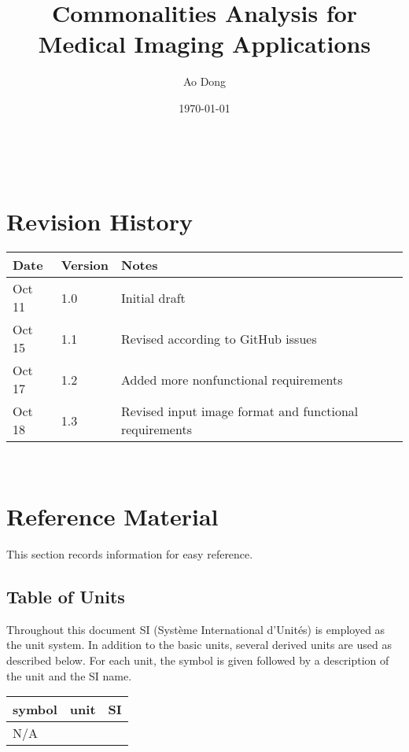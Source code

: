 \documentclass[12pt]{article}
\begin{document}
\title{Commonalities Analysis for Medical Imaging Applications} 
\author{Ao Dong}
\date{\today}

\maketitle

~\newpage


\section{Revision History}

\begin{tabularx}{\textwidth}{p{3cm}p{2cm}X}
\toprule {\bf Date} & {\bf Version} & {\bf Notes}\\
\midrule
Oct 11 & 1.0 & Initial draft\\
Oct 15 & 1.1 & Revised according to GitHub issues\\
Oct 17 & 1.2 & Added more nonfunctional requirements\\
Oct 18 & 1.3 & Revised input image format and functional requirements\\
\bottomrule
\end{tabularx}

~\newpage
	
\section{Reference Material}

This section records information for easy reference.

\subsection{Table of Units}

Throughout this document SI (Syst\`{e}me International d'Unit\'{e}s) is employed
as the unit system.  In addition to the basic units, several derived units are
used as described below.  For each unit, the symbol is given followed by a
description of the unit and the SI name.
~\newline

\renewcommand{\arraystretch}{1.2}
  \noindent \begin{tabular}{l l l} 
    \toprule		
    \textbf{symbol} & \textbf{unit} & \textbf{SI}\\
    \midrule 
    N/A\\
    \bottomrule
  \end{tabular}
\end{document}
